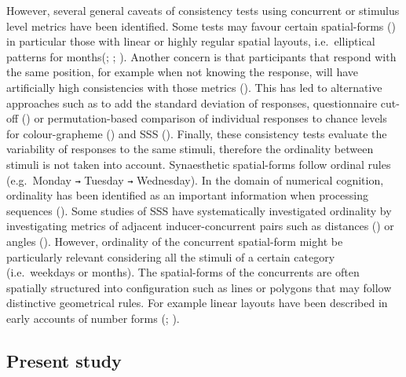 \documentclass[
  man,
  longtable,
  a4paper,
  nolmodern,
  notxfonts,
  notimes,
  colorlinks=true,linkcolor=blue,citecolor=blue,urlcolor=blue]{apa7}
\begin{document}
However, several general caveats of consistency tests using concurrent
or stimulus level metrics have been identified. Some tests may favour
certain spatial-forms () in
particular those with linear or highly regular spatial layouts,
i.e.~elliptical patterns for months(; ;
). Another concern is that
participants that respond with the same position, for example when not
knowing the response, will have artificially high consistencies with
those metrics (). This has
led to alternative approaches such as to add the standard deviation of
responses, questionnaire cut-off () or permutation-based comparison of individual responses to chance
levels for colour-grapheme ()
and SSS (). Finally, these
consistency tests evaluate the variability of responses to the same
stimuli, therefore the ordinality between stimuli is not taken into
account. Synaesthetic spatial-forms follow ordinal rules (e.g.~Monday
\texttt{→} Tuesday \texttt{→} Wednesday). In the domain of numerical
cognition, ordinality has been identified as an important information
when processing sequences (). Some studies of SSS have systematically investigated ordinality
by investigating metrics of adjacent inducer-concurrent pairs such as
distances () or angles
(). However, ordinality of
the concurrent spatial-form might be particularly relevant considering
all the stimuli of a certain category (i.e.~weekdays or months). The
spatial-forms of the concurrents are often spatially structured into
configuration such as lines or polygons that may follow distinctive
geometrical rules. For example linear layouts have been described in
early accounts of number forms (; ).

\subsection{Present study}\label{present-study}
\end{document}

